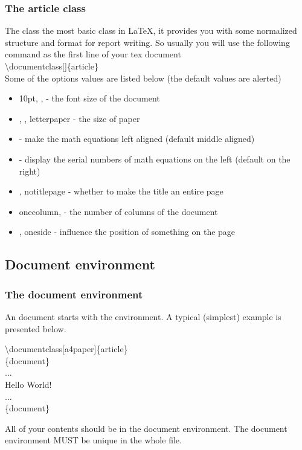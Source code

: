 \documentclass{beamer}
\begin{document}
\begin{frame}
	\frametitle{The article class}
	The  class the most basic class in \LaTeX, it provides you with some normalized structure and format for report writing. So usually you will use the following command as the first line of your tex document\\[0.5em]
	\alert{\textbackslash documentclass}[]\{article\}\\[0.5em]
	Some of the options values are listed below (the default values are \alert{alerted})
	\begin{itemize}
		\item \alert{10pt}, \structure{11pt}, \structure{12pt} - the font size of the document
		\item {}, , \alert{letterpaper} - the size of paper
		\item {} - make the math equations left aligned (default middle aligned)
		\item {} - display the serial numbers of math equations on the left (default on the right)
		\item {}, \alert{notitlepage} - whether to make the title an entire page
		\item \alert{onecolumn},  - the number of columns of the document
		\item {}, \alert{oneside} - influence the position of something on the page
	\end{itemize}
\end{frame}


\subsection{Document environment}

\begin{frame}
	\frametitle{The document environment}
	\begin{definition}
		An document starts with the  environment. A typical  (simplest) example is presented below.
	\end{definition}
	\begin{example}
		\alert{\textbackslash documentclass}[a4paper]\{article\}\\
		\{document\}\\
		\qquad...\\
		\qquad Hello World!\\
		\qquad...\\
		\{document\}\\
	\end{example}

	All of your contents should be in the document environment. The document environment \alert{MUST} be \alert{unique} in the whole file.
\end{frame}
\end{document}
